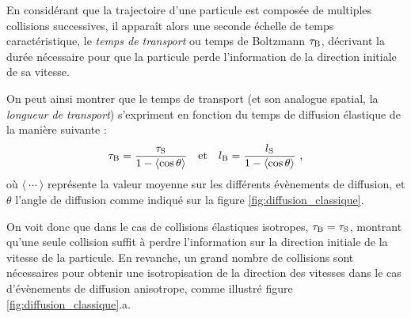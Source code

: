 En considérant que la trajectoire d'une particule est composée de multiples collisions successives, il apparaît alors une seconde échelle de temps caractéristique, le \emph{temps de transport} ou temps de Boltzmann $\tau_{\mathrm{B}}$, décrivant la durée nécessaire pour que la particule perde l'information de la direction initiale de sa vitesse. 


On peut ainsi montrer que le temps de transport (et son analogue spatial, la \emph{longueur de transport}) s'expriment en fonction du temps de diffusion élastique de la manière suivante \citep{akkermans2007mesoscopic}:
\begin{equation}
\tau_{\mathrm{B}}=\frac{\tau_{\mathrm{S}}}{1-\left\langle\cos{\theta}\right\rangle} \quad \text{et} \quad l_{\mathrm{B}}=\frac{l_{\mathrm{S}}}{1-\left\langle\cos{\theta}\right\rangle} \text{ ,}
\label{eq:definition_taub}
\end{equation}
où $\langle\:\cdots\:\rangle$ représente la valeur moyenne sur les différents évènements de diffusion, et $\theta$ l'angle de diffusion comme indiqué sur la figure \ref{fig:diffusion_classique}.

On voit donc que dans le cas de collisions élastiques isotropes, $\tau_{\mathrm{B}}=\tau_{\mathrm{S}}$, montrant qu'une seule collision suffit à perdre l'information sur la direction initiale de la vitesse de la particule. En revanche, un grand nombre de collisions sont nécessaires pour obtenir une isotropisation de la direction des vitesses dans le cas d'évènements de diffusion anisotrope, comme illustré figure \ref{fig:diffusion_classique}.a.


